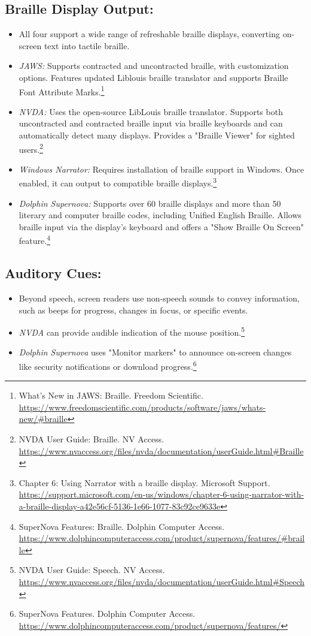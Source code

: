 \subsection*{Braille Display Output:}
\begin{itemize}
    \item All four support a wide range of refreshable braille displays, converting on-screen text into tactile braille.
    \item \emph{JAWS:} Supports contracted and uncontracted braille, with customization options. Features updated Liblouis braille translator and supports Braille Font Attribute Marks.\footnote{What's New in JAWS: Braille. Freedom Scientific. \url{https://www.freedomscientific.com/products/software/jaws/whats-new/\#braille}}
    \item \emph{NVDA:} Uses the open-source LibLouis braille translator. Supports both uncontracted and contracted braille input via braille keyboards and can automatically detect many displays. Provides a "Braille Viewer" for sighted users.\footnote{NVDA User Guide: Braille. NV Access. \url{https://www.nvaccess.org/files/nvda/documentation/userGuide.html\#Braille}}
    \item \emph{Windows Narrator:} Requires installation of braille support in Windows. Once enabled, it can output to compatible braille displays.\footnote{Chapter 6: Using Narrator with a braille display. Microsoft Support. \url{https://support.microsoft.com/en-us/windows/chapter-6-using-narrator-with-a-braille-display-a42e56cf-5136-1e66-1077-83c92ce9633e}}
    \item \emph{Dolphin Supernova:} Supports over 60 braille displays and more than 50 literary and computer braille codes, including Unified English Braille. Allows braille input via the display's keyboard and offers a "Show Braille On Screen" feature.\footnote{SuperNova Features: Braille. Dolphin Computer Access. \url{https://www.dolphincomputeraccess.com/product/supernova/features/\#braille}}
\end{itemize}

\subsection*{Auditory Cues:}
\begin{itemize}
    \item Beyond speech, screen readers use non-speech sounds to convey information, such as beeps for progress, changes in focus, or specific events.
    \item \emph{NVDA} can provide audible indication of the mouse position.\footnote{NVDA User Guide: Speech. NV Access. \url{https://www.nvaccess.org/files/nvda/documentation/userGuide.html\#Speech}}
    \item \emph{Dolphin Supernova} uses "Monitor markers" to announce on-screen changes like security notifications or download progress.\footnote{SuperNova Features. Dolphin Computer Access. \url{https://www.dolphincomputeraccess.com/product/supernova/features/}}
\end{itemize}

